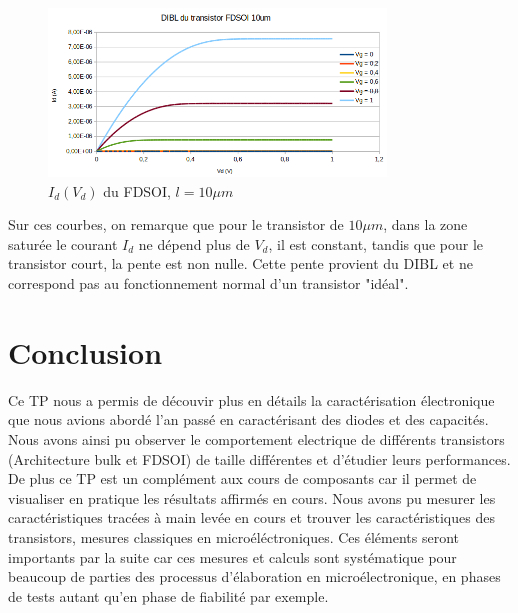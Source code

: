 \documentclass[a4paper,11pt]{report}
\begin{document}
\begin{figure}[h]
    \begin{center}
        \includegraphics[width=0.8\textwidth]{Images/DIBL-1-10}
        \caption{$I_d(V_d)$ du FDSOI, $l =10\mu m$}
        \label{DIBL_fdsoi_10um}
    \end{center}
\end{figure}

Sur ces courbes, on remarque que pour le transistor de $10\mu m$, dans la zone saturée le courant $I_d$ ne dépend plus de $V_d$, il est constant, tandis que pour le transistor court, la pente est non nulle. Cette pente provient du DIBL et ne correspond pas au fonctionnement normal d'un transistor "idéal".

\chapter*{Conclusion}

Ce TP nous a permis de découvir plus en détails la caractérisation électronique que nous avions abordé l'an passé en caractérisant des diodes et des capacités. Nous avons ainsi pu observer le comportement electrique de différents transistors (Architecture bulk et FDSOI) de taille différentes et d'étudier leurs performances. De plus ce TP est un complément aux cours de composants car il permet de visualiser en pratique les résultats affirmés en cours. Nous avons pu mesurer les caractéristiques tracées à main levée en cours et trouver les caractéristiques des transistors, mesures classiques en microéléctroniques. Ces éléments seront importants par la suite car ces mesures et calculs sont systématique pour beaucoup de parties des processus d'élaboration en microélectronique, en phases de tests autant qu'en phase de fiabilité par exemple.
\end{document}
